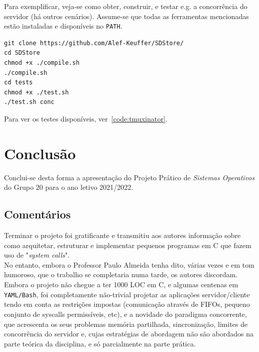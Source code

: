 \documentclass[11pt,a4paper]{report}%
\def\so{\emph{Sistemas Operativos}\xspace}
\begin{document}
Para exemplificar, veja-se como obter, construir, e testar e.g. a concorrência do servidor (há outros cenários).
Assume-se que todas as ferramentas mencionadas estão instaladas e disponíveis no \texttt{PATH}.

\begin{lstlisting}
git clone https://github.com/Alef-Keuffer/SDStore/
cd SDStore
chmod +x ./compile.sh
./compile.sh
cd tests
chmod +x ./test.sh
./test.sh conc
\end{lstlisting}

Para ver os testes disponíveis, ver~\ref{code:tmuxinator}.

\chapter{Conclusão} \label{concl}

Conclui-se desta forma a apresentação do Projeto Prático de \so do Grupo 20 para o
ano letivo 2021/2022.

\section{Comentários}

Terminar o projeto foi gratificante e transmitiu aos autores informação sobre como
arquitetar, estruturar e implementar pequenos programas em C que fazem uso de "\textit{system calls}".\\

No entanto, embora o Professor Paulo Almeida tenha dito, várias vezes e em tom humoroso, que o
trabalho se completaria numa tarde, os autores discordam.\\

Embora o projeto não chegue a ter 1000 LOC em C, e algumas centenas em \texttt{YAML/Bash},
foi completamente não-trivial projetar as aplicações servidor/cliente tendo em conta as restrições
impostas (comunicação através de FIFOs, pequeno conjunto de syscalls permissíveis, etc), e a novidade do
paradigma concorrente, que acrescenta os seus problemas \textemdash memória partilhada, sincronização,
limites de concorrência do servidor \textemdash e, cujas estratégias de abordagem não são abordados na parte
teórica da disciplina, e só parcialmente na parte prática.\\
\end{document}
